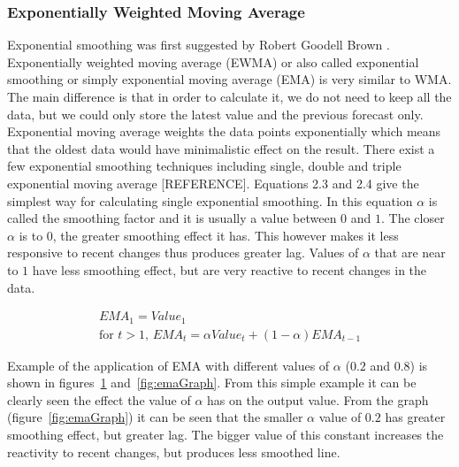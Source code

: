 \subsubsection{Exponentially Weighted Moving Average}
Exponential smoothing was first suggested by Robert Goodell Brown \cite{FOR3980040103}. Exponentially weighted moving average (EWMA) or also called exponential smoothing or simply exponential moving average (EMA) is very similar to WMA. The main difference is that in order to calculate it, we do not need to keep all the data, but we could only store the latest value and the previous forecast only. Exponential moving average weights the data points exponentially which means that the oldest data would have minimalistic effect on the result. There exist a few exponential smoothing techniques including single, double and triple exponential moving average [REFERENCE]. Equations 2.3 and 2.4 give the simplest way for calculating single exponential smoothing. In this equation $\alpha$ is called the smoothing factor and it is usually a value between $0$ and $1$. The closer $\alpha$ is to $0$, the greater smoothing effect it has. This however makes it less responsive to recent changes thus produces greater lag. Values of $\alpha$ that are near to $1$ have less smoothing effect, but are very reactive to recent changes in the data. 

\begin{align}\label{ema}
EMA_1 = Value_1 \\
\textrm{for } t > 1\textrm{, }EMA_t = \alpha Value_t + (1-\alpha) EMA_{t-1}
\end{align}

Example of the application of EMA with different values of $\alpha$ ($0.2$ and $0.8$) is shown in figures~\ref{fig:emaTable} and~\ref{fig:emaGraph}. From this simple example it can be clearly seen the effect the value of $\alpha$ has on the output value. From the graph (figure~\ref{fig:emaGraph}) it can be seen that the smaller $\alpha$ value of $0.2$ has greater smoothing effect, but greater lag. The bigger value of this constant increases the reactivity to recent changes, but produces less smoothed line.
\begin{figure}[ht]
	\caption{}
	\label{fig:emaTable}
\end{figure}


